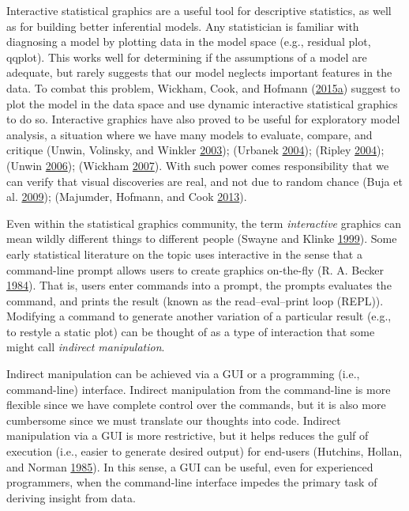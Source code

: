\documentclass[12pt,]{isuthesis}
\begin{document}
Interactive statistical graphics are a useful tool for descriptive
statistics, as well as for building better inferential models. Any
statistician is familiar with diagnosing a model by plotting data in the
model space (e.g., residual plot, qqplot). This works well for
determining if the assumptions of a model are adequate, but rarely
suggests that our model neglects important features in the data. To
combat this problem, Wickham, Cook, and Hofmann
(\protect\hyperlink{ref-Wickham:2015ur}{2015}\protect\hyperlink{ref-Wickham:2015ur}{a})
suggest to plot the model in the data space and use dynamic interactive
statistical graphics to do so. Interactive graphics have also proved to
be useful for exploratory model analysis, a situation where we have many
models to evaluate, compare, and critique (Unwin, Volinsky, and Winkler
\protect\hyperlink{ref-Unwin:2003uy}{2003}); (Urbanek
\protect\hyperlink{ref-Urbanek:2004}{2004}); (Ripley
\protect\hyperlink{ref-Ripley:2004}{2004}); (Unwin
\protect\hyperlink{ref-Unwin:2006}{2006}); (Wickham
\protect\hyperlink{ref-Wickham:2007wq}{2007}). With such power comes
responsibility that we can verify that visual discoveries are real, and
not due to random chance (Buja et al.
\protect\hyperlink{ref-Buja:2009hp}{2009}); (Majumder, Hofmann, and Cook
\protect\hyperlink{ref-Majumder:2013ie}{2013}).

Even within the statistical graphics community, the term
\emph{interactive} graphics can mean wildly different things to
different people (Swayne and Klinke
\protect\hyperlink{ref-swayne-klinke}{1999}). Some early statistical
literature on the topic uses interactive in the sense that a
command-line prompt allows users to create graphics on-the-fly (R. A.
Becker \protect\hyperlink{ref-S:1984}{1984}). That is, users enter
commands into a prompt, the prompts evaluates the command, and prints
the result (known as the read--eval--print loop (REPL)). Modifying a
command to generate another variation of a particular result (e.g., to
restyle a static plot) can be thought of as a type of interaction that
some might call \emph{indirect manipulation}.

Indirect manipulation can be achieved via a GUI or a programming (i.e.,
command-line) interface. Indirect manipulation from the command-line is
more flexible since we have complete control over the commands, but it
is also more cumbersome since we must translate our thoughts into code.
Indirect manipulation via a GUI is more restrictive, but it helps
reduces the gulf of execution (i.e., easier to generate desired output)
for end-users (Hutchins, Hollan, and Norman
\protect\hyperlink{ref-Hutchins:1985wu}{1985}). In this sense, a GUI can
be useful, even for experienced programmers, when the command-line
interface impedes the primary task of deriving insight from data.
\end{document}
